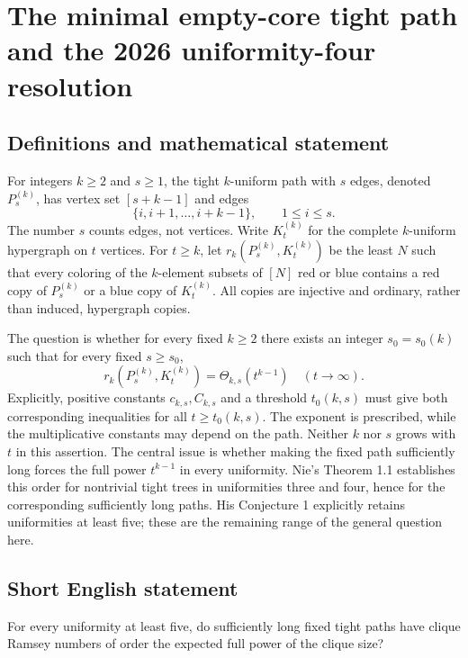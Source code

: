 \documentclass[11pt,a4paper]{article}
\begin{document}
\section*{The minimal empty-core tight path and the 2026 uniformity-four resolution}\label{statement}

\subsection{Definitions and mathematical statement}
For integers $k\ge2$ and $s\ge1$, the tight $k$-uniform path with
$s$ edges, denoted $P_s^{(k)}$, has vertex set $[s+k-1]$ and edges
\[
             \{i,i+1,\ldots,i+k-1\},\qquad 1\le i\le s.
\]
The number $s$ counts edges, not vertices. Write $K_t^{(k)}$ for the
complete $k$-uniform hypergraph on $t$ vertices. For $t\ge k$, let
$r_k(P_s^{(k)},K_t^{(k)})$ be the least $N$ such that every coloring
of the $k$-element subsets of $[N]$ red or blue contains a red copy of
$P_s^{(k)}$ or a blue copy of $K_t^{(k)}$. All copies are injective
and ordinary, rather than induced, hypergraph copies.

The question is whether for every fixed $k\ge2$ there exists an integer
$s_0=s_0(k)$ such that for every fixed $s\ge s_0$,
\[
               r_k(P_s^{(k)},K_t^{(k)})=\Theta_{k,s}(t^{k-1})
                       \quad(t\to\infty).
\]
Explicitly, positive constants $c_{k,s},C_{k,s}$ and a threshold
$t_0(k,s)$ must give both corresponding inequalities for all
$t\ge t_0(k,s)$. The exponent is prescribed, while the multiplicative
constants may depend on the path. Neither $k$ nor $s$ grows with $t$
in this assertion. The central issue is whether making the fixed path
sufficiently long forces the full power $t^{k-1}$ in every uniformity.
Nie's Theorem 1.1 establishes this order for nontrivial tight trees in
uniformities three and four, hence for the corresponding sufficiently
long paths. His Conjecture 1 explicitly retains uniformities at least
five; these are the remaining range of the general question here.
\subsection{Short English statement}
For every uniformity at least five, do sufficiently long fixed tight paths have clique Ramsey numbers of order the expected full power of the clique size?
\end{document}
